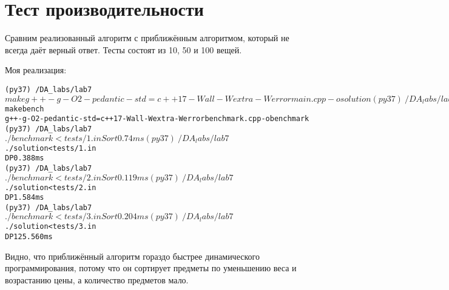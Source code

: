 \section{Тест производительности}

Сравним реализованный алгоритм с приближённым алгоритмом, который не всегда
даёт верный ответ.
Тесты состоят из 10, 50 и 100 вещей.

Моя реализация:
\begin{alltt}
(py37) ~ /DA_labs/lab7$ make
g++ -g -O2 -pedantic -std=c++17 -Wall -Wextra -Werror main.cpp -o solution
(py37) ~ /DA_labs/lab7$ make bench
g++ -g -O2 -pedantic -std=c++17 -Wall -Wextra -Werror benchmark.cpp -o benchmark
(py37) ~ /DA_labs/lab7$ ./benchmark <tests/1.in
Sort 0.74 ms
(py37) ~ /DA_labs/lab7$ ./solution <tests/1.in
DP 0.388 ms
(py37) ~ /DA_labs/lab7$ ./benchmark <tests/2.in
Sort 0.119 ms
(py37) ~ /DA_labs/lab7$ ./solution <tests/2.in
DP 1.584 ms
(py37) ~ /DA_labs/lab7$ ./benchmark <tests/3.in
Sort 0.204 ms
(py37) ~ /DA_labs/lab7$ ./solution <tests/3.in
DP 125.560 ms

\end{alltt}

Видно, что приближённый алгоритм гораздо быстрее динамического программирования, потому что он сортирует предметы по уменьшению веса и возрастанию цены,
а количество предметов мало.
\pagebreak


